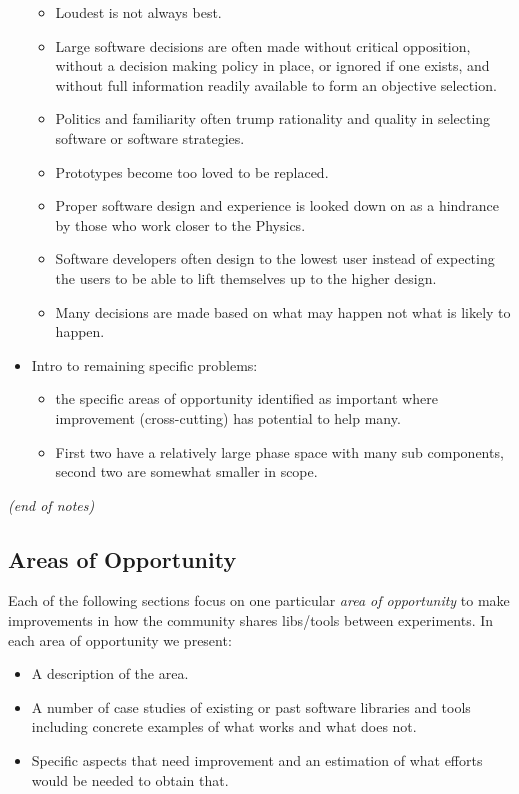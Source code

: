 \begin{itemize}
\begin{itemize}
\item Loudest is not always best.
\item Large software decisions are often made without critical opposition, without a decision making policy in place, or ignored if one exists, and without full information readily available to form an objective selection.
\item Politics and familiarity often trump rationality and quality in selecting software or software strategies.
\item Prototypes become too loved to be replaced.
\item Proper software design and experience is looked down on as a hindrance by those who work closer to the Physics.
\item Software developers often design to the lowest user instead of expecting the users to be able to lift themselves up to the higher design.
\item Many decisions are made based on what may happen not what is likely to happen.
  \end{itemize}

\item Intro to remaining specific problems:
\begin{itemize}
\item the specific areas of opportunity identified as important where improvement (cross-cutting) has potential to help many.
\item First two have a relatively large phase space with many sub components, second two are somewhat smaller in scope.
\end{itemize}

\end{itemize}
\textit{(end of notes)  }

\subsection{Areas of Opportunity}

Each of the following sections focus on one particular \textit{area of opportunity} to make improvements in how the community shares libs/tools between experiments.  In each area of opportunity we present:

\begin{itemize}
\item A description of the area.
\item A number of case studies of existing or past software libraries and tools including concrete examples of what works and what does not.
\item Specific aspects that need improvement and an estimation of what efforts would be needed to obtain that.
\end{itemize}
